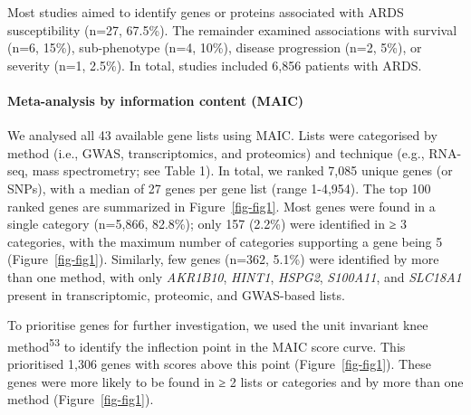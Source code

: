 \documentclass[
  11,
  a4paper,
]{article}
\let\oldparagraph\paragraph
\renewcommand{\paragraph}[1]{\oldparagraph{#1}\mbox{}}
\begin{document}
Most studies aimed to identify genes or proteins associated with ARDS
susceptibility (n=27, 67.5\%). The remainder examined associations with
survival (n=6, 15\%), sub-phenotype (n=4, 10\%), disease progression
(n=2, 5\%), or severity (n=1, 2.5\%). In total, studies included 6,856
patients with ARDS.

\paragraph{Meta-analysis by information content
(MAIC)}\label{meta-analysis-by-information-content-maic}

We analysed all 43 available gene lists using MAIC. Lists were
categorised by method (i.e., GWAS, transcriptomics, and proteomics) and
technique (e.g., RNA-seq, mass spectrometry; see Table 1). In total, we
ranked 7,085 unique genes (or SNPs), with a median of 27 genes per gene
list (range 1-4,954). The top 100 ranked genes are summarized in
Figure~\ref{fig-fig1}. Most genes were found in a single category
(n=5,866, 82.8\%); only 157 (2.2\%) were identified in ≥ 3 categories,
with the maximum number of categories supporting a gene being 5
(Figure~\ref{fig-fig1}). Similarly, few genes (n=362, 5.1\%) were
identified by more than one method, with only \emph{AKR1B10},
\emph{HINT1}, \emph{HSPG2}, \emph{S100A11}, and \emph{SLC18A1} present
in transcriptomic, proteomic, and GWAS-based lists.

To prioritise genes for further investigation, we used the unit
invariant knee method\textsuperscript{53} to identify the inflection
point in the MAIC score curve. This prioritised 1,306 genes with scores
above this point (Figure~\ref{fig-fig1}). These genes were more likely
to be found in ≥ 2 lists or categories and by more than one method
(Figure~\ref{fig-fig1}).
\end{document}
